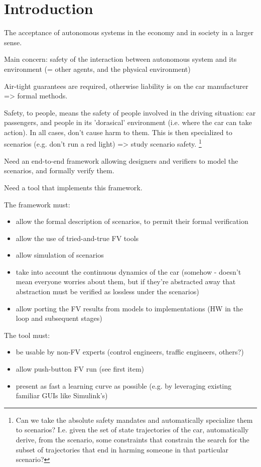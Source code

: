 \section{Introduction}
\label{introduction}

The acceptance of autonomous systems in the economy and in society in a larger sense.

Main concern: safety of the interaction between autonomous system and its environment (= other agents, and the physical environment)

Air-tight guarantees are required, otherwise liability is on the car manufacturer => formal methods.

Safety, to people, means the safety of people involved in the driving situation: car passengers, and people in its 'dorasical' environment (i.e. where the car can take action). 
In all cases, don't cause harm to them. 
This is then specialized to scenarios (e.g. don't run a red light) => study scenario safety.
\footnote{Can we take the absolute safety mandates and automatically specialize them to scenarios? I.e. given the set of state trajectories of the car, automatically derive, from the scenario, some constraints that constrain the search for the subset of trajectories that end in harming someone in that particular scenario?}

Need an end-to-end framework allowing designers and verifiers to model the scenarios, and formally verify them.


Need a tool that implements this framework.

The framework must: 
\begin{itemize}
\item allow the formal description of scenarios, to permit their formal verification
\item allow the use of tried-and-true FV tools
\item allow simulation of scenarios
\item take into account the continuous dynamics of the car (somehow - doesn't mean everyone worries about them, but if they're abstracted away that abstraction must be verified as lossless under the scenarios)
\item allow porting the FV results from models to implementations (HW in the loop and subsequent stages)
\end{itemize}

The tool must:
\begin{itemize}
	\item be usable by non-FV experts (control engineers, traffic engineers, others?)
	\item allow push-button FV run (see first item)
	\item present as fast a learning curve as possible (e.g. by leveraging existing familiar GUIs like Simulink's)
\end{itemize}


